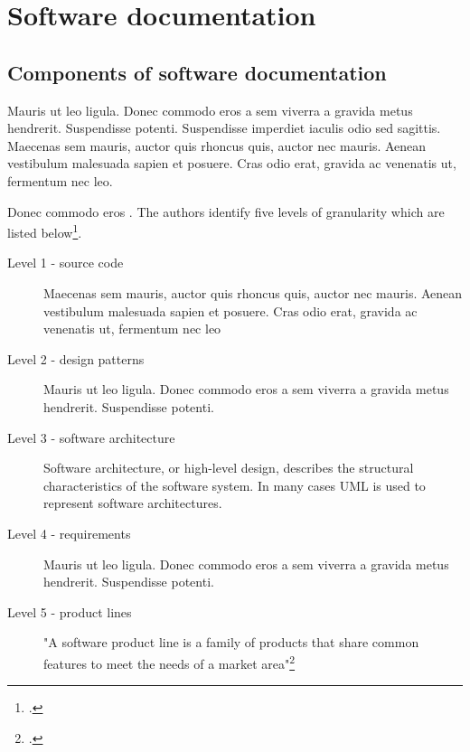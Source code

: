 \newpage
\section{Software documentation}
\FloatBarrier %


\subsection{Components of software documentation}
Mauris ut leo ligula. Donec commodo eros a sem viverra a gravida metus
hendrerit. Suspendisse potenti. Suspendisse imperdiet iaculis odio sed
sagittis. Maecenas sem mauris, auctor quis rhoncus quis, auctor nec mauris.
Aenean vestibulum malesuada sapien et posuere. Cras odio erat, gravida ac
venenatis ut, fermentum nec leo.

Donec commodo eros . The
authors identify five levels of granularity which are listed
below\footcite[Cf.][98]{huang_towards_2003}.

\begin{description}
	\item[Level 1 - source code] Maecenas sem mauris, auctor quis rhoncus
	     quis, auctor nec mauris. Aenean vestibulum malesuada sapien et
	     posuere. Cras odio erat, gravida ac venenatis ut, fermentum nec
	     leo

	\item[Level 2 - design patterns] Mauris ut leo ligula. Donec commodo
	     eros a sem viverra a gravida metus hendrerit. Suspendisse
	     potenti.

	\item[Level 3 - software architecture] Software architecture, or
	     high-level design, describes the structural characteristics of the
	     software system. In many cases UML is used to represent software
	     architectures.

	\item[Level 4 - requirements] Mauris ut leo ligula. Donec commodo eros
	     a sem viverra a gravida metus hendrerit. Suspendisse potenti.

	\item[Level 5 - product lines] "A software product line is a family of
	     products that share common features to meet the needs of a market
	     area"\footcite[][]{ardis_et_al_2000}
\end{description}


